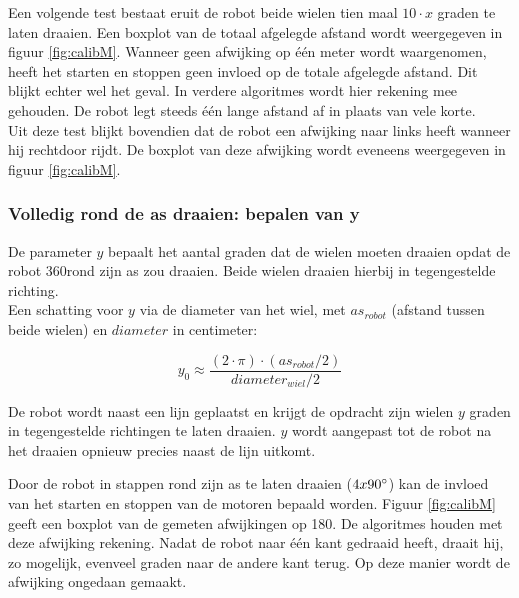 \documentclass[tt3]{penoverslag}
\begin{document}
Een volgende test bestaat eruit de robot beide wielen tien maal $10 \cdot x$ graden te laten draaien. Een boxplot van de totaal afgelegde afstand wordt weergegeven in figuur \ref{fig:calibM}. Wanneer geen afwijking op \'e\'en meter wordt waargenomen, heeft het starten en stoppen geen invloed op de totale afgelegde afstand. Dit blijkt echter wel het geval. In verdere algoritmes wordt hier rekening mee gehouden. De robot legt steeds \'e\'en lange afstand af in plaats van vele korte.\\
Uit deze test blijkt bovendien dat de robot een afwijking naar links heeft wanneer hij rechtdoor rijdt. De boxplot van deze afwijking wordt eveneens weergegeven in figuur \ref{fig:calibM}.


\subsubsection{Volledig rond de as draaien: bepalen van y} %
\label{ssec:calibMy}
De parameter $y$ bepaalt het aantal graden dat de wielen moeten draaien opdat de robot 360\degree rond zijn as zou draaien. Beide wielen draaien hierbij in tegengestelde richting.\\
Een schatting voor $y$ via de diameter van het wiel, met $as_{robot}$ (afstand tussen beide wielen) en $diameter$ in centimeter:

\begin{equation*}
y_{0} \approx \frac{(2 \cdot \pi) \cdot (as_{robot}/2)}{diameter_{wiel}/2}
\end{equation*}

De robot wordt naast een lijn geplaatst en krijgt de opdracht zijn wielen $y$ graden in tegengestelde richtingen te laten draaien. $y$ wordt aangepast tot de robot na het draaien opnieuw precies naast de lijn uitkomt.


Door de robot in stappen rond zijn as te laten draaien ($4x90\degree$) kan de invloed van het starten en stoppen van de motoren bepaald worden. Figuur \ref{fig:calibM} geeft een boxplot van de gemeten afwijkingen op 180\degree. De algoritmes houden met deze afwijking rekening. Nadat de robot naar \'e\'en kant gedraaid heeft, draait hij, zo mogelijk, evenveel graden naar de andere kant terug. Op deze manier wordt de afwijking ongedaan gemaakt.
\end{document}
